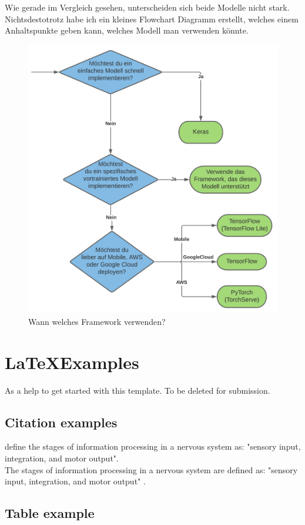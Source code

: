 Wie gerade im Vergleich gesehen, unterscheiden sich beide Modelle nicht stark. Nichtsdestotrotz habe ich ein kleines Flowchart Diagramm erstellt, 
welches einem Anhaltspunkte geben kann, welches Modell man verwenden könnte. 

\begin{figure}[htbp]
    \centering
    \includegraphics[width=.9\textwidth]{figures/decision-tree}
    \caption{Wann welches Framework verwenden?}
    \label{fig:decision-tree}
\end{figure}

\newpage
\section{\LaTeX Examples}
As a help to get started with this template. To be deleted for submission.
\subsection{Citation examples}
\citet{campbell:2017} define the stages of information processing in a nervous system as: "sensory input, integration, and motor output". \\
The stages of information processing in a nervous system are defined as: "sensory input, integration, and motor output" \citep{campbell:2017}. 

\subsection{Table example}


